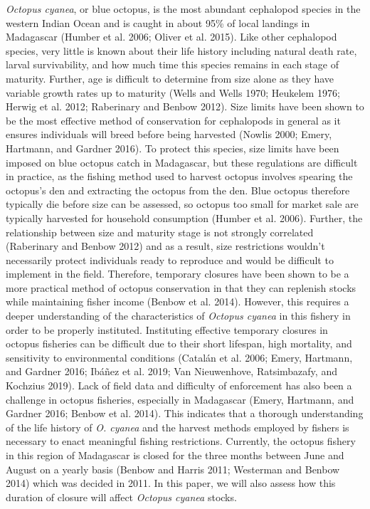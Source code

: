 \documentclass[
]{article}
\begin{document}
\emph{Octopus cyanea}, or blue octopus, is the most abundant cephalopod species in the western Indian Ocean and is caught in about 95\% of local landings in Madagascar (Humber et al. 2006; Oliver et al. 2015). Like other cephalopod species, very little is known about their life history including natural death rate, larval survivability, and how much time this species remains in each stage of maturity. Further, age is difficult to determine from size alone as they have variable growth rates up to maturity (Wells and Wells 1970; Heukelem 1976; Herwig et al. 2012; Raberinary and Benbow 2012). Size limits have been shown to be the most effective method of conservation for cephalopods in general as it ensures individuals will breed before being harvested (Nowlis 2000; Emery, Hartmann, and Gardner 2016). To protect this species, size limits have been imposed on blue octopus catch in Madagascar, but these regulations are difficult in practice, as the fishing method used to harvest octopus involves spearing the octopus's den and extracting the octopus from the den. Blue octopus therefore typically die before size can be assessed, so octopus too small for market sale are typically harvested for household consumption (Humber et al. 2006). Further, the relationship between size and maturity stage is not strongly correlated (Raberinary and Benbow 2012) and as a result, size restrictions wouldn't necessarily protect individuals ready to reproduce and would be difficult to implement in the field. Therefore, temporary closures have been shown to be a more practical method of octopus conservation in that they can replenish stocks while maintaining fisher income (Benbow et al. 2014). However, this requires a deeper understanding of the characteristics of \emph{Octopus cyanea} in this fishery in order to be properly instituted. Instituting effective temporary closures in octopus fisheries can be difficult due to their short lifespan, high mortality, and sensitivity to environmental conditions (Catalán et al. 2006; Emery, Hartmann, and Gardner 2016; Ibáñez et al. 2019; Van Nieuwenhove, Ratsimbazafy, and Kochzius 2019). Lack of field data and difficulty of enforcement has also been a challenge in octopus fisheries, especially in Madagascar (Emery, Hartmann, and Gardner 2016; Benbow et al. 2014). This indicates that a thorough understanding of the life history of \emph{O. cyanea} and the harvest methods employed by fishers is necessary to enact meaningful fishing restrictions. Currently, the octopus fishery in this region of Madagascar is closed for the three months between June and August on a yearly basis (Benbow and Harris 2011; Westerman and Benbow 2014) which was decided in 2011. In this paper, we will also assess how this duration of closure will affect \emph{Octopus cyanea} stocks.
\end{document}
